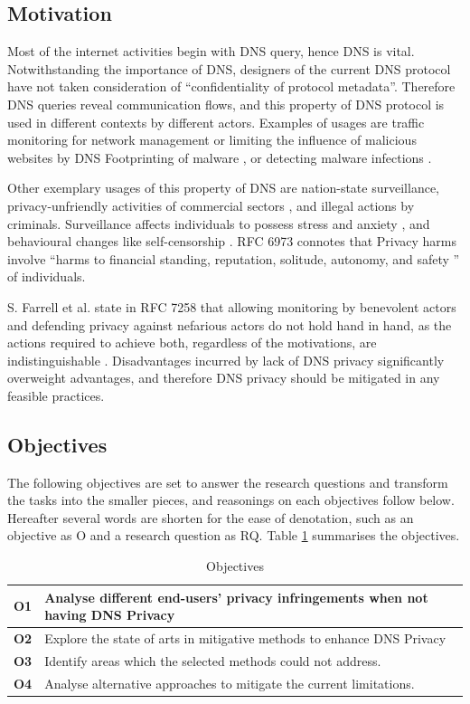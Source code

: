 \documentclass[a4paper,12pt]{article}
\begin{document}
\subsection{Motivation}
Most of the internet activities begin with DNS query, hence DNS is vital. Notwithstanding the importance of DNS, designers of the current DNS protocol have not taken consideration of ``confidentiality of protocol metadata''. Therefore DNS queries reveal communication flows, and this property of DNS protocol is used in different contexts by different actors. Examples of usages are traffic monitoring for network management or limiting the influence of malicious websites by DNS Footprinting of malware \cite{stoner2010dns}, or detecting malware infections \cite{lemos2013got}.

Other exemplary usages of this property of DNS are nation-state surveillance, privacy-unfriendly activities of commercial sectors \cite{weaver2011redirecting}, and illegal actions by criminals. Surveillance affects individuals to possess stress and anxiety \cite{oulasvirta2012long}, and behavioural changes like self-censorship \cite{rfc6973}. RFC 6973 connotes that Privacy harms involve ``harms to financial standing, reputation, solitude, autonomy, and safety \cite{rfc6973}'' of individuals.

S. Farrell et al. state in RFC 7258 that allowing monitoring by benevolent actors and defending privacy against nefarious actors do not hold hand in hand, as the actions required to achieve both, regardless of the motivations, are indistinguishable \cite{rfc7258}.
Disadvantages incurred by lack of DNS privacy significantly overweight advantages, and therefore DNS privacy should be mitigated in any feasible practices.

\subsection{Objectives}
The following objectives are set to answer the research questions and transform the tasks into the smaller pieces, and reasonings on each objectives follow below. Hereafter several words are shorten for the ease of denotation, such as an objective as O and a research question as RQ. Table \ref{objectives} summarises the objectives.
\begin{table}[h!]
    \begin{tabular} {|p{1.2cm}|p{12.8cm}|} \hline
        \textbf{O1} & Analyse different end-users' privacy infringements when not having DNS Privacy\\ \hline
        \textbf{O2} & Explore the state of arts in mitigative methods to enhance DNS Privacy \\ \hline
        \textbf{O3} & Identify areas which the selected methods could not address. \\ \hline
        \textbf{O4} & Analyse alternative approaches to mitigate the current limitations.\\ \hline
    \end{tabular}
    \caption{Objectives}
    \label{objectives}
\end{table}
\end{document}
